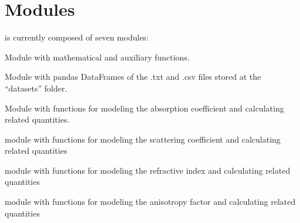 \documentclass[letterpaper,10pt,english]{sphinxmanual}
\begin{document}
\chapter{Modules}
\label{\detokenize{index:modules}}
\sphinxAtStartPar
{} is currently composed of seven modules:

\begin{DUlineblock}{0em}
\item[] \sphinxhyphen{} 
\item[] Module with mathematical and auxiliary functions.
\end{DUlineblock}

\begin{DUlineblock}{0em}
\item[] \sphinxhyphen{} 
\item[] Module with pandas DataFrames of the .txt and .csv files stored at the “datasets” folder.
\end{DUlineblock}

\begin{DUlineblock}{0em}
\item[] \sphinxhyphen{} 
\item[] Module with functions for modeling the absorption coefficient and calculating related quantities.
\end{DUlineblock}

\begin{DUlineblock}{0em}
\item[] \sphinxhyphen{} 
\item[] module with functions for modeling the scattering coefficient and calculating related quantities
\end{DUlineblock}

\begin{DUlineblock}{0em}
\item[] \sphinxhyphen{} 
\item[] module with functions for modeling the refractive index and calculating related quantities
\end{DUlineblock}

\begin{DUlineblock}{0em}
\item[] \sphinxhyphen{} 
\item[] module with functions for modeling the anisotropy factor and calculating related quantities
\end{DUlineblock}
\end{document}
